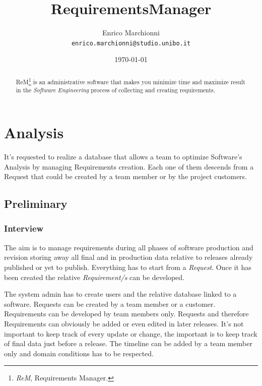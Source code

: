 \documentclass[12pt, a4paper]{report}
\title{
    RequirementsManager
}
\author{
    Enrico Marchionni\\
    \texttt{enrico.marchionni@studio.unibo.it}
}
\date{\today}
\begin{document}
\maketitle

\begin{abstract}

ReM\footnote{\emph{ReM}, Requirements Manager.} is an administrative software that makes you minimize time and maximize result in
the \emph{Software Engineering} process of collecting and creating requirements.

\end{abstract}

\tableofcontents

\chapter*{Analysis}

It's requested to realize a database that allows a team to optimize Software's Analysis by managing Requirements creation.
Each one of them descends from a Request that could be created by a team member or by the project customers.

\section*{Preliminary}
\label{sec:preliminary}

\subsection*{Interview}
\label{subsec:interview}

The aim is to manage requirements during all phases of software production and revision storing away all final and in production
data relative to releases already published or yet to publish. Everything has to start from a \emph{Request}.
Once it has been created the relative \emph{Requirement/s} can be developed.

The system admin has to create users and the relative database linked to a software.
Requests can be created by a team member or a customer. Requirements can be developed by team members only. Requests and therefore
Requirements can obviously be added or even edited in later releases. It's not important to keep track of every update or change,
the important is to keep track of final data just before a release. The timeline can be added by a team member only and domain
conditions has to be respected.
\end{document}
